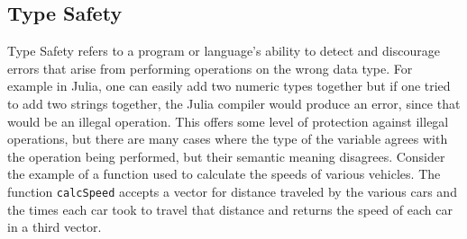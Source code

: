 \subsection{Type Safety}
Type Safety refers to a program or language's ability to detect and discourage errors that arise from performing
operations on the wrong data type. For example in Julia, one can easily add two numeric types together but if one tried
to add two strings together, the Julia compiler would produce an error, since that would be an illegal operation. This
offers some level of protection against illegal operations, but there are many cases where the type of the variable
agrees with the operation being performed, but their semantic meaning disagrees. Consider the example of a function used
to calculate the speeds of various vehicles. The function \lstinline[language=Julia]{calcSpeed} accepts a vector for
distance traveled by the various cars and the times each car took to travel that distance and returns the speed of each
car in a third vector.

